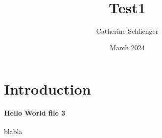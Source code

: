\documentclass{article}
\title{Test1}
\author{Catherine Schlienger}
\date{March 2024}
\begin{document}
\maketitle

\section{Introduction}
\paragraph{Hello World file 3}

blabla
\end{document}
